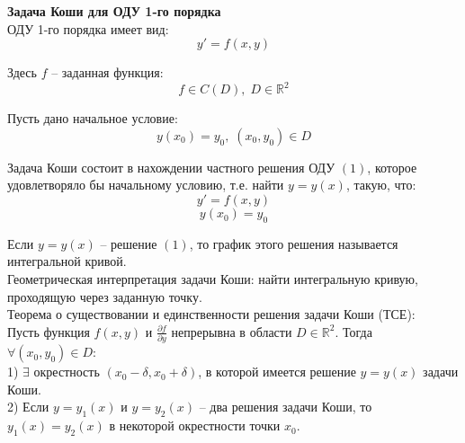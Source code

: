 \documentclass{article}
\begin{document}
	
	\textbf{Задача Коши для ОДУ 1-го порядка}\\

	ОДУ 1-го порядка имеет вид:
	\begin{equation}
		y' = f(x,y)
	\end{equation}

	Здесь $f$ -- заданная функция:
	\begin{equation}
		f\in C(D),\;D\in \mathbb{R}^2
	\end{equation}

	Пусть дано начальное условие:
	\begin{equation}
		y(x_0) = y_0,\;(x_0,y_0)\in D
	\end{equation}

	Задача Коши состоит в нахождении частного решения ОДУ $(1)$, которое удовлетворяло бы начальному условию, т.е. найти $y=y(x)$, такую, что:
	\begin{equation}
		y' = f(x,y)
	\end{equation}
	\begin{equation}
		y(x_0) = y_0
	\end{equation}

	Если $y=y(x)$ -- решение $(1)$, то график этого решения называется интегральной кривой.\\

	Геометрическая интерпретация задачи Коши: найти интегральную кривую, проходящую через заданную точку.\\

	Теорема о существовании и единственности решения задачи Коши (ТСЕ):\\

	Пусть функция $f(x,y)$ и $\frac{\partial f}{\partial y}$ непрерывна в области $D \in \mathbb{R}^2$. Тогда $\forall (x_0,y_0)\in D$:\\

	1) $\exists$ окрестность $(x_0-\delta,x_0+\delta)$, в которой имеется решение $y=y(x)$ задачи Коши.\\

	2) Если $y=y_1(x)$ и $y=y_2(x)$ -- два решения задачи Коши, то $y_1(x)=y_2(x)$ в некоторой окрестности точки $x_0$.
\end{document}
